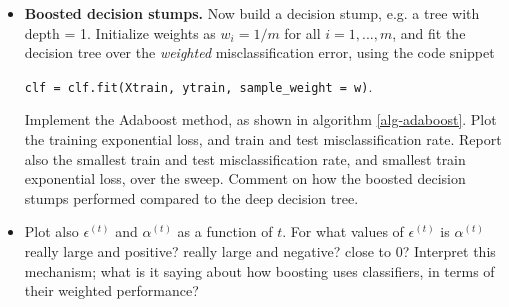 \documentclass{article}
\begin{document}
\begin{enumerate}
\begin{enumerate}
\begin{itemize}
\item \textbf{Boosted decision stumps.} Now build  a decision stump, e.g. a tree with depth = 1. Initialize weights as $w_i = 1/m$ for all $i = 1,...,m$, and fit the decision tree over the \emph{weighted} misclassification error, using the code snippet

\begin{center}
\texttt{clf = clf.fit(Xtrain, ytrain, sample\_weight = w)}.
\end{center}




Implement the Adaboost method, as shown in algorithm \ref{alg-adaboost}. Plot the training exponential loss, and train and test misclassification  rate. 
Report also the smallest  train and test misclassification rate, and smallest train exponential loss, over the sweep. Comment on how the boosted decision stumps performed compared to the deep decision tree.



\item 
Plot also $\epsilon^{(t)}$ and $\alpha^{(t)}$ as a function of $t$. For what values of $\epsilon^{(t)}$ is $\alpha^{(t)}$ really large and positive? really large and negative? close to 0? Interpret this mechanism; what is it saying about how boosting uses classifiers, in terms of their weighted performance?



\end{itemize}



\end{enumerate}


\end{enumerate}


\newpage
\end{document}
